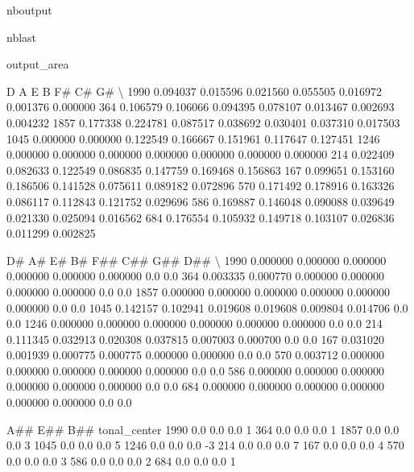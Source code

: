 \documentclass[letterpaper,10pt,english]{sphinxmanual}
\begin{document}
\begin{sphinxuseclass}{nboutput}
\begin{sphinxuseclass}{nblast}
{\begin{sphinxuseclass}{output_area}
\begin{sphinxuseclass}{}
\begin{sphinxVerbatim}[commandchars=\\\{\}]
             D         A         E         B        F\#        C\#        G\#  \textbackslash{}
1990  0.094037  0.015596  0.021560  0.055505  0.016972  0.001376  0.000000
364   0.106579  0.106066  0.094395  0.078107  0.013467  0.002693  0.004232
1857  0.177338  0.224781  0.087517  0.038692  0.030401  0.037310  0.017503
1045  0.000000  0.000000  0.122549  0.166667  0.151961  0.117647  0.127451
1246  0.000000  0.000000  0.000000  0.000000  0.000000  0.000000  0.000000
214   0.022409  0.082633  0.122549  0.086835  0.147759  0.169468  0.156863
167   0.099651  0.153160  0.186506  0.141528  0.075611  0.089182  0.072896
570   0.171492  0.178916  0.163326  0.086117  0.112843  0.121752  0.029696
586   0.169887  0.146048  0.090088  0.039649  0.021330  0.025094  0.016562
684   0.176554  0.105932  0.149718  0.103107  0.026836  0.011299  0.002825

            D\#        A\#        E\#        B\#       F\#\#       C\#\#  G\#\#  D\#\#  \textbackslash{}
1990  0.000000  0.000000  0.000000  0.000000  0.000000  0.000000  0.0  0.0
364   0.003335  0.000770  0.000000  0.000000  0.000000  0.000000  0.0  0.0
1857  0.000000  0.000000  0.000000  0.000000  0.000000  0.000000  0.0  0.0
1045  0.142157  0.102941  0.019608  0.019608  0.009804  0.014706  0.0  0.0
1246  0.000000  0.000000  0.000000  0.000000  0.000000  0.000000  0.0  0.0
214   0.111345  0.032913  0.020308  0.037815  0.007003  0.000700  0.0  0.0
167   0.031020  0.001939  0.000775  0.000775  0.000000  0.000000  0.0  0.0
570   0.003712  0.000000  0.000000  0.000000  0.000000  0.000000  0.0  0.0
586   0.000000  0.000000  0.000000  0.000000  0.000000  0.000000  0.0  0.0
684   0.000000  0.000000  0.000000  0.000000  0.000000  0.000000  0.0  0.0

      A\#\#  E\#\#  B\#\#  tonal\_center
1990  0.0  0.0  0.0             1
364   0.0  0.0  0.0             1
1857  0.0  0.0  0.0             3
1045  0.0  0.0  0.0             5
1246  0.0  0.0  0.0            -3
214   0.0  0.0  0.0             7
167   0.0  0.0  0.0             4
570   0.0  0.0  0.0             3
586   0.0  0.0  0.0             2
684   0.0  0.0  0.0             1
\end{sphinxVerbatim}



\end{sphinxuseclass}
\end{sphinxuseclass}
}

\end{sphinxuseclass}
\end{sphinxuseclass}
\end{document}
